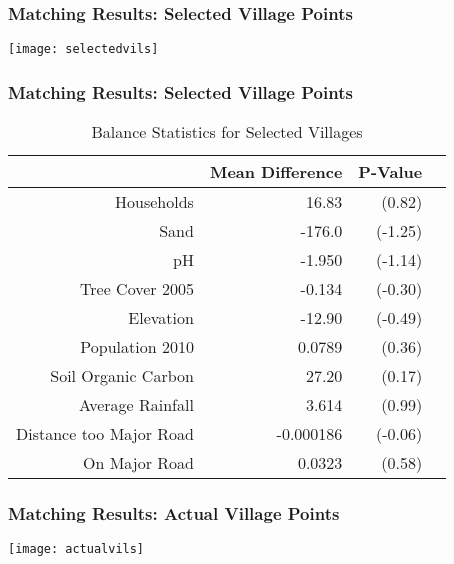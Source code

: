 \documentclass{beamer}
\begin{document}
\begin{frame}
\frametitle{Matching Results: Selected Village Points}
\texttt{[image: selectedvils]}

\end{frame}

\begin{frame}
\frametitle{Matching Results: Selected Village Points}

\begin{table}[ht]\centering
\caption{Balance Statistics for Selected Villages}
\begin{tabular}{rrrr}
 \hline
 & Mean Difference & P-Value \\ 
  \hline
Households  &       16.83         &      (0.82)\\
Sand        &      -176.0         &     (-1.25)\\
pH          &      -1.950         &     (-1.14)\\
Tree Cover 2005      &      -0.134         &     (-0.30)\\
Elevation       &      -12.90         &     (-0.49)\\
Population 2010       &      0.0789         &      (0.36)\\
Soil Organic Carbon         &       27.20         &      (0.17)\\
Average Rainfall  &       3.614         &      (0.99)\\
Distance too Major Road  &   -0.000186         &     (-0.06)\\
On Major Road     &      0.0323         &      (0.58)\\
\hline
\end{tabular}
\end{table}

\end{frame}

\begin{frame}
\frametitle{Matching Results: Actual Village Points}
\texttt{[image: actualvils]}

\end{frame}
\end{document}

